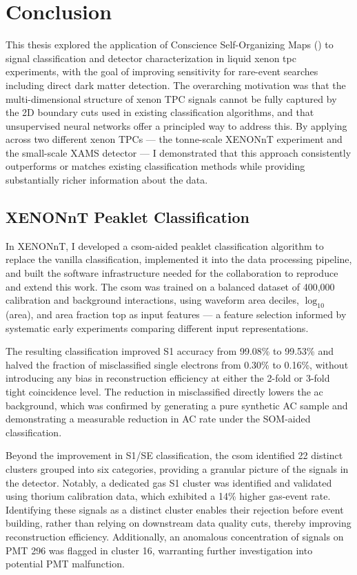 \section{Conclusion}

This thesis explored the application of Conscience Self-Organizing Maps () to signal classification and detector characterization in liquid xenon \acrfull{tpc} experiments, with the goal of improving sensitivity for rare-event searches including direct dark matter detection. The overarching motivation was that the multi-dimensional structure of xenon TPC signals cannot be fully captured by the 2D boundary cuts used in existing classification algorithms, and that unsupervised neural networks offer a principled way to address this. By applying  across two different xenon TPCs — the tonne-scale XENONnT experiment and the small-scale XAMS detector — I demonstrated that this approach consistently outperforms or matches existing classification methods while providing substantially richer information about the data.

\subsection*{XENONnT Peaklet Classification}

In XENONnT, I developed a \acrshort{csom}-aided peaklet classification algorithm to replace the vanilla classification, implemented it into the data processing pipeline, and built the software infrastructure needed for the collaboration to reproduce and extend this work. The \acrshort{csom} was trained on a balanced dataset of 400,000 calibration and background interactions, using waveform area deciles, $\log_{10}$(area), and area fraction top as input features — a feature selection informed by systematic early experiments comparing different input representations.

The resulting classification improved S1 accuracy from 99.08\% to 99.53\% and halved the fraction of misclassified single electrons from 0.30\% to 0.16\%, without introducing any bias in reconstruction efficiency at either the 2-fold or 3-fold tight coincidence level. The reduction in misclassified  directly lowers the \acrfull{ac} background, which was confirmed by generating a pure synthetic AC sample and demonstrating a measurable reduction in AC rate under the SOM-aided classification.

Beyond the improvement in S1/SE classification, the \acrshort{csom} identified 22 distinct clusters grouped into six categories, providing a granular picture of the signals in the detector. Notably, a dedicated gas S1 cluster was identified and validated using thorium calibration data, which exhibited a 14\% higher gas-event rate. Identifying these signals as a distinct cluster enables their rejection before event building, rather than relying on downstream data quality cuts, thereby improving reconstruction efficiency. Additionally, an anomalous concentration of signals on PMT 296 was flagged in cluster 16, warranting further investigation into potential PMT malfunction.

